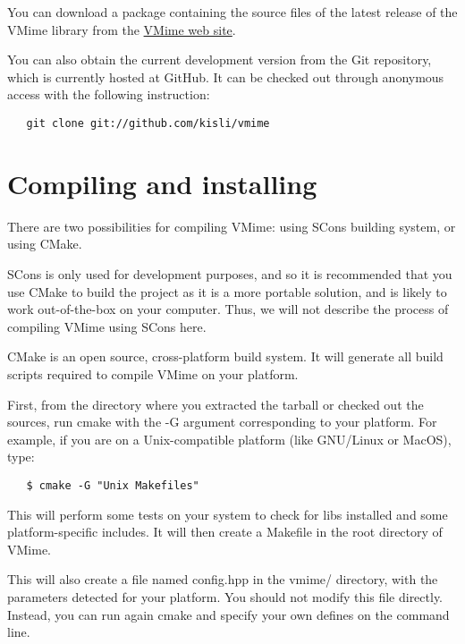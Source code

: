 You can download a package containing the source files of the latest release
of the VMime library from the \href{http://www.vmime.org/}{VMime web site}.

You can also obtain the current development version from the Git repository,
which is currently hosted at GitHub. It can be checked out through anonymous
access with the following instruction:

\begin{verbatim}
   git clone git://github.com/kisli/vmime
\end{verbatim}

\section{Compiling and installing}

There are two possibilities for compiling VMime: using SCons building system,
or using CMake.

SCons is only used for development purposes, and so it is recommended that you
use CMake to build the project as it is a more portable solution, and is
likely to work out-of-the-box on your computer. Thus, we will not describe
the process of compiling VMime using SCons here.

CMake is an open source, cross-platform build system. It will generate all
build scripts required to compile VMime on your platform.

First, from the directory where you extracted the tarball or checked out
the sources, run {\vcode cmake} with the {\vcode -G} argument corresponding
to your platform. For example, if you are on a Unix-compatible platform (like
GNU/Linux or MacOS), type:

\begin{verbatim}
   $ cmake -G "Unix Makefiles"
\end{verbatim}

This will perform some tests on your system to check for libs installed
and some platform-specific includes. It will then create a Makefile in
the root directory of VMime.


This will also create a file named {\vcode config.hpp} in the {\vcode vmime/}
directory, with the parameters detected for your platform. You should not
modify this file directly. Instead, you can run again {\vcode cmake} and
specify your own defines on the command line.

